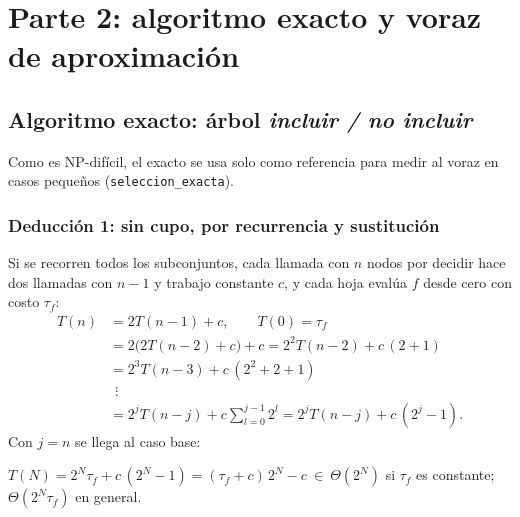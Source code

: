 \section{Parte 2: algoritmo exacto y voraz de aproximación}\label{sec:seleccion}

\subsection{Algoritmo exacto: árbol \emph{incluir / no incluir}}

Como \SEL{} es NP-difícil, el exacto se usa solo como referencia para medir al voraz en casos
pequeños (\texttt{seleccion\_exacta}).

\begin{algorithm}[H]
\caption{\textsc{SelecciónExacta}$(S_1,\dots,S_N,\ k)$ — \texttt{seleccion\_exacta}}\label{alg:exacto}
\;
\end{algorithm}

\subsubsection*{Deducción 1: sin cupo, por recurrencia y sustitución}

Si se recorren todos los subconjuntos, cada llamada con $n$ nodos por decidir hace dos llamadas con
$n-1$ y trabajo constante $c$, y cada hoja evalúa $f$ desde cero con costo $\tau_f$:
\begin{align*}
T(n) &= 2T(n-1)+c,\qquad T(0)=\tau_f\\
     &= 2\big(2T(n-2)+c\big)+c = 2^2T(n-2)+c\,(2+1)\\
     &= 2^3T(n-3)+c\,(2^2+2+1)\\
     &\ \ \vdots\\
     &= 2^jT(n-j)+c\sum_{l=0}^{j-1}2^l = 2^jT(n-j)+c\,(2^j-1).
\end{align*}
Con $j=n$ se llega al caso base:
\begin{clave}
$T(N)=2^N\tau_f+c\,(2^N-1)=(\tau_f+c)\,2^N-c\ \in\ \Theta(2^N)$ si $\tau_f$ es constante; $\Theta(2^N\tau_f)$ en general.
\end{clave}

